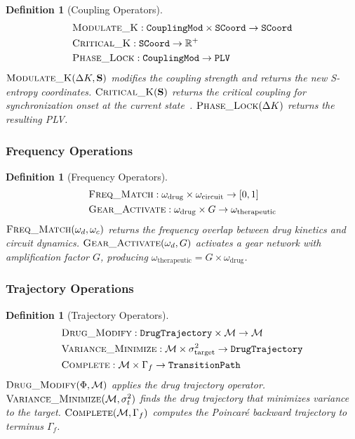 \documentclass[10pt,twocolumn]{article}
\newtheorem{definition}[theorem]{Definition}
\theoremstyle{remark}
\newcommand{\Scoord}{\mathbf{S}}
\newcommand{\Gstate}{\Gamma}
\newcommand{\Mstate}{\mathcal{M}}
\begin{document}
\begin{definition}[Coupling Operators]
\label{def:coupling_ops}
\begin{align}
&\textsc{Modulate\_K} : \texttt{CouplingMod} \times \texttt{SCoord} \to \texttt{SCoord} \notag \\
&\textsc{Critical\_K} : \texttt{SCoord} \to \mathbb{R}^+ \notag \\
&\textsc{Phase\_Lock} : \texttt{CouplingMod} \to \texttt{PLV} \notag
\end{align}
$\textsc{Modulate\_K}(\Delta K, \Scoord)$ modifies the coupling strength and returns the new S-entropy coordinates. $\textsc{Critical\_K}(\Scoord)$ returns the critical coupling for synchronization onset at the current state~\cite{acebron2005kuramoto}. $\textsc{Phase\_Lock}(\Delta K)$ returns the resulting PLV.
\end{definition}

\subsubsection{Frequency Operations}

\begin{definition}[Frequency Operators]
\label{def:freq_ops}
\begin{align}
&\textsc{Freq\_Match} : \omega_{\mathrm{drug}} \times \omega_{\mathrm{circuit}} \to [0,1] \notag \\
&\textsc{Gear\_Activate} : \omega_{\mathrm{drug}} \times G \to \omega_{\mathrm{therapeutic}} \notag
\end{align}
$\textsc{Freq\_Match}(\omega_d, \omega_c)$ returns the frequency overlap between drug kinetics and circuit dynamics. $\textsc{Gear\_Activate}(\omega_d, G)$ activates a gear network with amplification factor $G$, producing $\omega_{\mathrm{therapeutic}} = G \times \omega_{\mathrm{drug}}$.
\end{definition}

\subsubsection{Trajectory Operations}

\begin{definition}[Trajectory Operators]
\label{def:traj_ops}
\begin{align}
&\textsc{Drug\_Modify} : \texttt{DrugTrajectory} \times \Mstate \to \Mstate \notag \\
&\textsc{Variance\_Minimize} : \Mstate \times \sigma^2_{\mathrm{target}} \to \texttt{DrugTrajectory} \notag \\
&\textsc{Complete} : \Mstate \times \Gstate_f \to \texttt{TransitionPath} \notag
\end{align}
$\textsc{Drug\_Modify}(\Phi, \Mstate)$ applies the drug trajectory operator. $\textsc{Variance\_Minimize}(\Mstate, \sigma^2_t)$ finds the drug trajectory that minimizes variance to the target. $\textsc{Complete}(\Mstate, \Gstate_f)$ computes the Poincar\'{e} backward trajectory to terminus $\Gstate_f$.
\end{definition}
\end{document}
